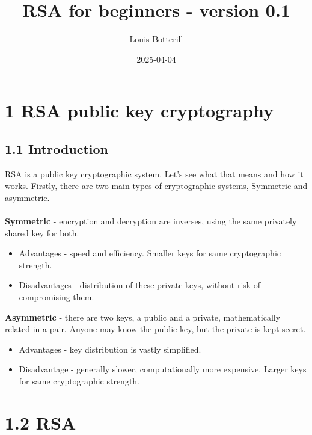 \documentclass[11pt]{article}   	%
\title{RSA for beginners - version 0.1}
\author{Louis Botterill}
\date{2025-04-04}					%
\begin{document}
\maketitle

\pagebreak

\section*{1 RSA public key cryptography}

\subsection*{1.1 Introduction}

RSA is a public key cryptographic system. Let's see what that means and how it works.
Firstly, there are two main types of cryptographic systems, Symmetric and asymmetric. \\
\\
\textbf{Symmetric} - encryption and decryption are inverses, using the same privately shared key for both.
\begin{itemize}
 \item Advantages - speed and efficiency. Smaller keys for same cryptographic strength.
 \item Disadvantages - distribution of these private keys, without risk of compromising them.
\end{itemize}

\textbf{Asymmetric} - there are two keys, a public and a private, mathematically related in a pair. Anyone may know the public key, but the private is kept secret.
\begin{itemize}
 \item Advantages - key distribution is vastly simplified.
 \item Disadvantage - generally slower, computationally more expensive. Larger keys for same cryptographic strength.
\end{itemize}


\section*{1.2 RSA}
\end{document}
